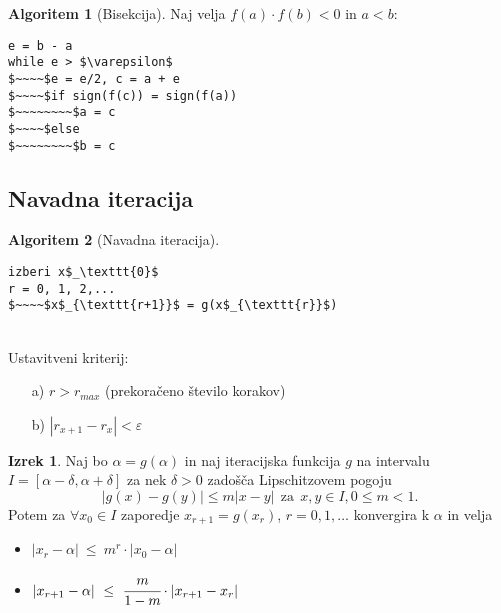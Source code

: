 \documentclass[11pt]{article}
\theoremstyle{definition}
\newtheorem{izrek}{Izrek}
\newtheorem*{algoritem}{Algoritem}
\begin{document}
\begin{algoritem}[Bisekcija]

Naj velja $f(a) \cdot f(b) < 0$ in $a < b$:
\begin{lstlisting}
e = b - a
while e > $\varepsilon$
$~~~~$e = e/2, c = a + e
$~~~~$if sign(f(c)) = sign(f(a))
$~~~~~~~~$a = c
$~~~~$else
$~~~~~~~~$b = c
\end{lstlisting}
\end{algoritem}
\vspace{0.5cm}


\subsection{Navadna iteracija}
\vspace{0.5cm}

\begin{algoritem}[Navadna iteracija]
~\\
\begin{lstlisting}
izberi x$_\texttt{0}$
r = 0, 1, 2,...
$~~~~$x$_{\texttt{r+1}}$ = g(x$_{\texttt{r}}$)
\end{lstlisting}
~\\
Ustavitveni kriterij:
\begin{enumerate}
	\item[a)] $r > r_{max}$ (prekoračeno število korakov)
	\item[b)] $|r_{x+1} - r_x| < \varepsilon$
\end{enumerate}
\end{algoritem}
\vspace{0.5cm}

\begin{izrek}

Naj bo $\alpha = g(\alpha)$ in naj iteracijska  funkcija $g$ na intervalu $I = [\alpha - \delta, \alpha + \delta]$ za nek $\delta > 0$ zadošča Lipschitzovem pogoju
$$|g(x) - g(y)| \leq m|x - y| ~~\text{za}~~ x, y \in I, 0 \leq m < 1.$$
Potem za $\forall x_0 \in I$ zaporedje $x_{r+1} = g(x_r)$, $r = 0, 1, \ldots$ konvergira k $\alpha$ in velja
\begin{itemize}
	\item $|x_r - \alpha| ~\leq~ m^r \cdot |x_0 - \alpha|$
	\item $|x_{r+1} - \alpha| ~\leq~ \cfrac{m}{1-m} \cdot |x_{r+1} - x_r|$
\end{itemize}

\end{izrek}
\vspace{0.5cm}
\end{document}
